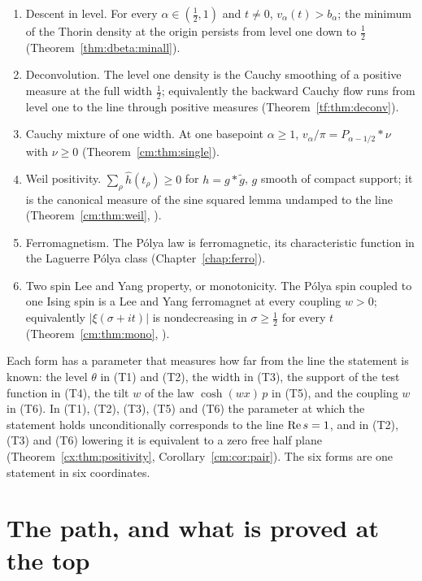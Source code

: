 \begin{enumerate}
\item[(T1)] Descent in level. For every $\alpha\in(\frac12,1)$ and $t\ne0$, $v_\alpha(t)>b_\alpha$; the minimum of the Thorin density at the origin persists from level one down to $\frac12$ (Theorem~\ref{thm:dbeta:minall}).
\item[(T2)] Deconvolution. The level one density is the Cauchy smoothing of a positive measure at the full width $\frac12$; equivalently the backward Cauchy flow runs from level one to the line through positive measures (Theorem~\ref{tf:thm:deconv}).
\item[(T3)] Cauchy mixture of one width. At one basepoint $\alpha\ge1$, $v_\alpha/\pi=P_{\alpha-1/2}*\nu$ with $\nu\ge0$ (Theorem~\ref{cm:thm:single}).
\item[(T4)] Weil positivity. $\sum_\rho\widehat h(t_\rho)\ge0$ for $h=g*\tilde g$, $g$ smooth of compact support; it is the canonical measure of the sine squared lemma undamped to the line (Theorem~\ref{cm:thm:weil}, \cite{Weil52}).
\item[(T5)] Ferromagnetism. The P\'olya law is ferromagnetic, its characteristic function in the Laguerre P\'olya class (Chapter~\ref{chap:ferro}).
\item[(T6)] Two spin Lee and Yang property, or monotonicity. The P\'olya spin coupled to one Ising spin is a Lee and Yang ferromagnet at every coupling $w>0$; equivalently $|\xi(\sigma+it)|$ is nondecreasing in $\sigma\ge\frac12$ for every $t$ (Theorem~\ref{cm:thm:mono}, \cite{SD10}).
\end{enumerate}

Each form has a parameter that measures how far from the line the statement is known: the level $\theta$ in (T1) and (T2), the width in (T3), the support of the test function in (T4), the tilt $w$ of the law $\cosh(wx)\,p$ in (T5), and the coupling $w$ in (T6). In (T1), (T2), (T3), (T5) and (T6) the parameter at which the statement holds unconditionally corresponds to the line $\operatorname{Re} s=1$, and in (T2), (T3) and (T6) lowering it is equivalent to a zero free half plane (Theorem~\ref{cx:thm:positivity}, Corollary~\ref{cm:cor:pair}). The six forms are one statement in six coordinates.

\section{The path, and what is proved at the top}\label{route:sec:top}\label{ch:path}\label{sec:ch25:path}


